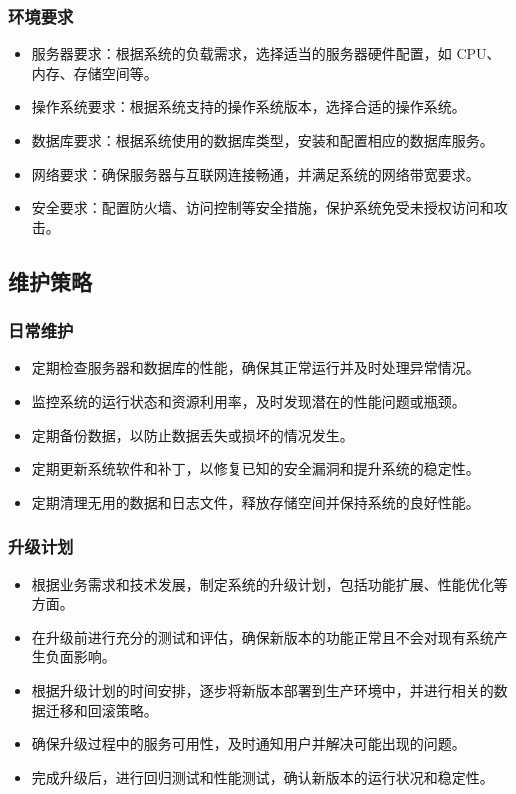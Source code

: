 \documentclass{article}
\begin{document}
\subsubsection{环境要求}
\begin{itemize}
	\item 服务器要求：根据系统的负载需求，选择适当的服务器硬件配置，如 CPU、内存、存储空间等。
	\item 操作系统要求：根据系统支持的操作系统版本，选择合适的操作系统。
	\item 数据库要求：根据系统使用的数据库类型，安装和配置相应的数据库服务。
	\item 网络要求：确保服务器与互联网连接畅通，并满足系统的网络带宽要求。
	\item 安全要求：配置防火墙、访问控制等安全措施，保护系统免受未授权访问和攻击。
\end{itemize}

\subsection{维护策略}
\subsubsection{日常维护}
\begin{itemize}
	\item 定期检查服务器和数据库的性能，确保其正常运行并及时处理异常情况。
	\item 监控系统的运行状态和资源利用率，及时发现潜在的性能问题或瓶颈。
	\item 定期备份数据，以防止数据丢失或损坏的情况发生。
	\item 定期更新系统软件和补丁，以修复已知的安全漏洞和提升系统的稳定性。
	\item 定期清理无用的数据和日志文件，释放存储空间并保持系统的良好性能。
\end{itemize}

\subsubsection{升级计划}
\begin{itemize}
	\item 根据业务需求和技术发展，制定系统的升级计划，包括功能扩展、性能优化等方面。
	\item 在升级前进行充分的测试和评估，确保新版本的功能正常且不会对现有系统产生负面影响。
	\item 根据升级计划的时间安排，逐步将新版本部署到生产环境中，并进行相关的数据迁移和回滚策略。
	\item 确保升级过程中的服务可用性，及时通知用户并解决可能出现的问题。
	\item 完成升级后，进行回归测试和性能测试，确认新版本的运行状况和稳定性。
\end{itemize}
\end{document}
